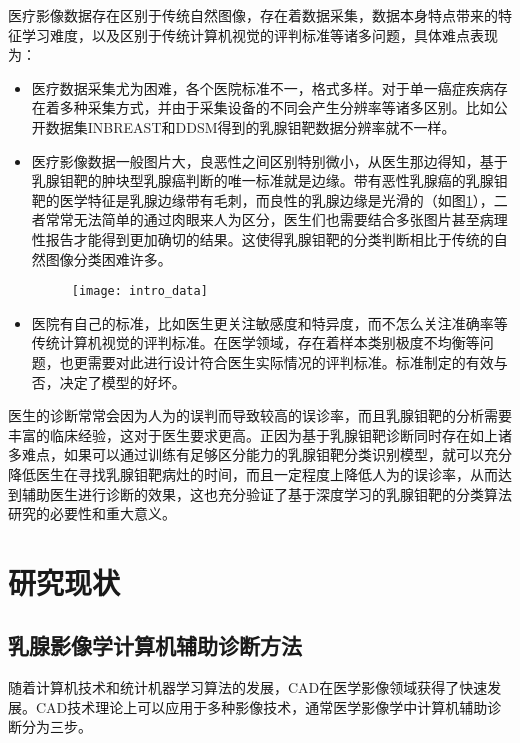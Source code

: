 医疗影像数据存在区别于传统自然图像，存在着数据采集，数据本身特点带来的特征学习难度，以及区别于传统计算机视觉的评判标准等诸多问题，具体难点表现为：
\begin{itemize}
	\item 医疗数据采集尤为困难，各个医院标准不一，格式多样。对于单一癌症疾病存在着多种采集方式，并由于采集设备的不同会产生分辨率等诸多区别。比如公开数据集INBREAST\cite{27moreira2012inbreast}和DDSM\cite{21lee2018curated, 22lee2017curated,23clark2013cancer}得到的乳腺钼靶数据分辨率就不一样。
	\item 医疗影像数据一般图片大，良恶性之间区别特别微小，从医生那边得知，基于乳腺钼靶的肿块型乳腺癌判断的唯一标准就是边缘。带有恶性乳腺癌的乳腺钼靶的医学特征是乳腺边缘带有毛刺，而良性的乳腺边缘是光滑的（如图\ref{fig:intro_data}），二者常常无法简单的通过肉眼来人为区分，医生们也需要结合多张图片甚至病理性报告才能得到更加确切的结果。这使得乳腺钼靶的分类判断相比于传统的自然图像分类困难许多。
	\begin{figure}[!htbp]
    \centering
    \texttt{[image: intro\_data]}
    \label{fig:intro_data}
	\end{figure}
	\item 医院有自己的标准，比如医生更关注敏感度和特异度，而不怎么关注准确率等传统计算机视觉的评判标准。在医学领域，存在着样本类别极度不均衡等问题，也更需要对此进行设计符合医生实际情况的评判标准。标准制定的有效与否，决定了模型的好坏。
\end{itemize}

	医生的诊断常常会因为人为的误判而导致较高的误诊率，而且乳腺钼靶的分析需要丰富的临床经验，这对于医生要求更高。正因为基于乳腺钼靶诊断同时存在如上诸多难点，如果可以通过训练有足够区分能力的乳腺钼靶分类识别模型，就可以充分降低医生在寻找乳腺钼靶病灶的时间，而且一定程度上降低人为的误诊率，从而达到辅助医生进行诊断的效果，这也充分验证了基于深度学习的乳腺钼靶的分类算法研究的必要性和重大意义。


\section{研究现状}
\subsection{乳腺影像学计算机辅助诊断方法}
随着计算机技术和统计机器学习算法的发展，CAD在医学影像领域获得了快速发展。CAD技术理论上可以应用于多种影像技术，通常医学影像学中计算机辅助诊断分为三步。

